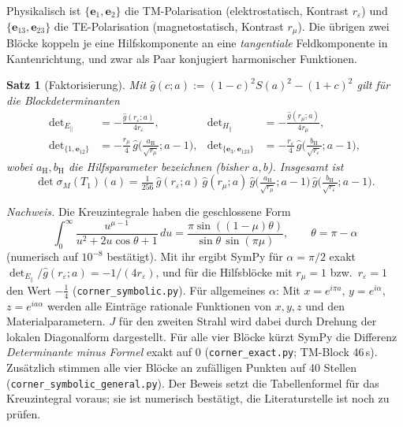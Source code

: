 \documentclass[11pt, a4paper]{article}
\newcommand{\mvec}[1]{\boldsymbol{#1}}
\theoremstyle{plain}
\newtheorem{satz}{Satz}[section]
\theoremstyle{definition}
\newcommand{\status}[1]{\hfill{\small\sffamily[#1]}}
\begin{document}
Physikalisch ist $\{\mvec{e}_1,\mvec{e}_2\}$ die TM-Polarisation (elektrostatisch,
Kontrast $r_\varepsilon$) und $\{\mvec{e}_{13},\mvec{e}_{23}\}$ die TE-Polarisation
(magnetostatisch, Kontrast $r_\mu$). Die übrigen zwei Blöcke koppeln je eine
Hilfskomponente an eine \emph{tangentiale} Feldkomponente in Kantenrichtung, und
zwar als Paar konjugiert harmonischer Funktionen.

\begin{satz}[Faktorisierung]\label{satz:faktor}
\status{bewiesen, exakt für allgemeines $\alpha$}
Mit $\hat g(c;a) := (1-c)^2S(a)^2 - (1+c)^2$ gilt für die Blockdeterminanten
\begin{align*}
  \det\nolimits_{E_\parallel} &= -\frac{\hat g(r_\varepsilon;a)}{4r_\varepsilon}, &
  \det\nolimits_{H_\parallel} &= -\frac{\hat g(r_\mu;a)}{4r_\mu},\\
  \det\nolimits_{\{1,\mvec{e}_{12}\}} &= -\frac{r_\mu}{4}\,\hat g\Big(\tfrac{a_{\mathrm{H}}}{\sqrt{r_\mu}};a-1\Big), &
  \det\nolimits_{\{\mvec{e}_3,\mvec{e}_{123}\}} &= -\frac{r_\varepsilon}{4}\,\hat g\Big(\tfrac{b_{\mathrm{H}}}{\sqrt{r_\varepsilon}};a-1\Big),
\end{align*}
wobei $a_{\mathrm H}, b_{\mathrm H}$ die Hilfsparameter bezeichnen (bisher $a,b$). Insgesamt ist
\[
  \det\sigma_M(T_1)(a) = \tfrac{1}{256}\,\hat g(r_\varepsilon;a)\,\hat g(r_\mu;a)\,
  \hat g\Big(\tfrac{a_{\mathrm H}}{\sqrt{r_\mu}};a-1\Big)\,\hat g\Big(\tfrac{b_{\mathrm H}}{\sqrt{r_\varepsilon}};a-1\Big).
\]
\end{satz}
\noindent\emph{Nachweis.} Die Kreuzintegrale haben die geschlossene Form
\[
  \int_0^\infty\frac{u^{\mu-1}}{u^2+2u\cos\theta+1}\,du=\frac{\pi\sin((1-\mu)\theta)}{\sin\theta\,\sin(\pi\mu)},
  \qquad \theta=\pi-\alpha
\]
(numerisch auf $10^{-8}$ bestätigt). Mit ihr ergibt SymPy für $\alpha=\pi/2$ exakt
$\det_{E_\parallel}/\hat g(r_\varepsilon;a) = -1/(4r_\varepsilon)$, und für die Hilfsblöcke
mit $r_\mu = 1$ bzw.\ $r_\varepsilon = 1$ den Wert $-\tfrac14$ (\texttt{corner\_symbolic.py}).
Für allgemeines $\alpha$: Mit $x=e^{i\pi a}$, $y=e^{i\alpha}$, $z=e^{ia\alpha}$ werden
alle Einträge rationale Funktionen von $x,y,z$ und den Materialparametern.
$J$ für den zweiten Strahl wird dabei durch Drehung der lokalen Diagonalform
dargestellt. Für alle vier Blöcke kürzt SymPy die Differenz
\emph{Determinante minus Formel} exakt auf $0$ (\texttt{corner\_exact.py}; TM-Block 46\,s).
Zusätzlich stimmen alle vier Blöcke an zufälligen Punkten auf 40 Stellen
(\texttt{corner\_symbolic\_general.py}). Der Beweis setzt die Tabellenformel für
das Kreuzintegral voraus; sie ist numerisch bestätigt, die Literaturstelle ist
noch zu prüfen.
\end{document}

